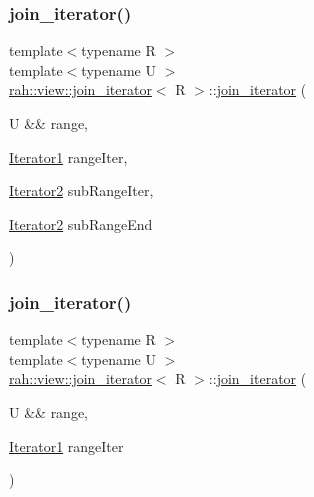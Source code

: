 \subsubsection{\texorpdfstring{join\_iterator()}{join\_iterator()}\hspace{0.1cm}{\footnotesize\ttfamily [1/4]}}
{\footnotesize\ttfamily template$<$typename R $>$ \\
template$<$typename U $>$ \\
\mbox{\hyperlink{structrah_1_1view_1_1join__iterator}{rah\+::view\+::join\+\_\+iterator}}$<$ R $>$\+::\mbox{\hyperlink{structrah_1_1view_1_1join__iterator}{join\+\_\+iterator}} (\begin{DoxyParamCaption}\item[{U \&\&}]{range,  }\item[{\mbox{\hyperlink{structrah_1_1view_1_1join__iterator_a8b71c6f25eee2915e2a8afc6e024196d}{Iterator1}}}]{range\+Iter,  }\item[{\mbox{\hyperlink{structrah_1_1view_1_1join__iterator_ae03a066174f3422c70d0e3c22e68d9f7}{Iterator2}}}]{sub\+Range\+Iter,  }\item[{\mbox{\hyperlink{structrah_1_1view_1_1join__iterator_ae03a066174f3422c70d0e3c22e68d9f7}{Iterator2}}}]{sub\+Range\+End }\end{DoxyParamCaption})\hspace{0.3cm}{\ttfamily [inline]}}

\mbox{\label{structrah_1_1view_1_1join__iterator_a2ba7e5d1fd1ea1e786ca894fe96ffeb4}} 
\subsubsection{\texorpdfstring{join\_iterator()}{join\_iterator()}\hspace{0.1cm}{\footnotesize\ttfamily [2/4]}}
{\footnotesize\ttfamily template$<$typename R $>$ \\
template$<$typename U $>$ \\
\mbox{\hyperlink{structrah_1_1view_1_1join__iterator}{rah\+::view\+::join\+\_\+iterator}}$<$ R $>$\+::\mbox{\hyperlink{structrah_1_1view_1_1join__iterator}{join\+\_\+iterator}} (\begin{DoxyParamCaption}\item[{U \&\&}]{range,  }\item[{\mbox{\hyperlink{structrah_1_1view_1_1join__iterator_a8b71c6f25eee2915e2a8afc6e024196d}{Iterator1}}}]{range\+Iter }\end{DoxyParamCaption})\hspace{0.3cm}{\ttfamily [inline]}}

